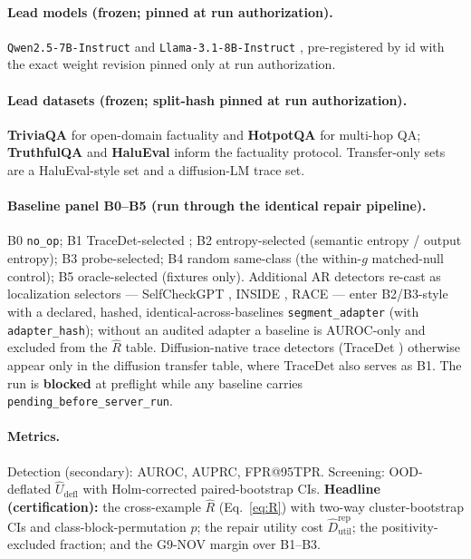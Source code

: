 \documentclass[11pt]{article}
\theoremstyle{plain}
\theoremstyle{definition}
\newcommand{\Rhat}{\widehat{R}}
\newcommand{\Udefl}{\widehat{U}_{\mathrm{defl}}}
\newcommand{\Dutilr}{\widehat{D}^{\mathrm{rep}}_{\mathrm{util}}}
\begin{document}
\paragraph{Lead models (frozen; pinned at run authorization).}
\texttt{Qwen2.5-7B-Instruct} \cite{qwen2025technical} and
\texttt{Llama-3.1-8B-Instruct} \cite{grattafiori2024llama}, pre-registered by id
with the exact weight revision pinned only at run authorization.

\paragraph{Lead datasets (frozen; split-hash pinned at run authorization).}
\textbf{TriviaQA} \cite{joshi2017triviaqa} for open-domain factuality and
\textbf{HotpotQA} \cite{yang2018hotpotqa} for multi-hop QA; \textbf{TruthfulQA}
\cite{lin2022truthfulqa} and \textbf{HaluEval} \cite{li2023halueval} inform the
factuality protocol. Transfer-only sets are a HaluEval-style set and a diffusion-LM
trace set.

\paragraph{Baseline panel B0--B5 (run through the identical repair pipeline).}
B0 \texttt{no\_op}; B1 TraceDet-selected \cite{tracedet2026diffusion};
B2 entropy-selected (semantic entropy \cite{farquhar2024semantic} / output entropy);
B3 probe-selected; B4 random same-class (the within-$g$ matched-null control);
B5 oracle-selected (fixtures only). Additional AR detectors re-cast as localization
selectors --- SelfCheckGPT \cite{manakul2023selfcheckgpt}, INSIDE
\cite{chen2024inside}, RACE \cite{race2025reasoning} --- enter B2/B3-style with a
declared, hashed, identical-across-baselines \texttt{segment\_adapter} (with
\texttt{adapter\_hash}); without an audited adapter a baseline is AUROC-only and
excluded from the $\Rhat$ table. Diffusion-native trace detectors (TraceDet
\cite{tracedet2026diffusion}) otherwise appear only in the diffusion transfer table,
where TraceDet also serves as B1. The run is \textbf{blocked} at preflight while any
baseline carries \texttt{pending\_before\_server\_run}.

\paragraph{Metrics.} Detection (secondary): AUROC, AUPRC, FPR@95TPR. Screening:
OOD-deflated $\Udefl$ with Holm-corrected paired-bootstrap CIs. \textbf{Headline
(certification):} the cross-example $\Rhat$ (Eq.~\ref{eq:R}) with two-way
cluster-bootstrap CIs and class-block-permutation $p$; the repair utility cost
$\Dutilr$; the positivity-excluded fraction; and the G9-NOV margin over B1--B3.
\end{document}
